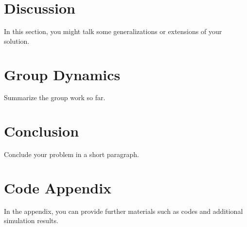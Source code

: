 \documentclass[10pt]{article}
\begin{document}
\section{Discussion}
In this section, you might talk some generalizations or extensions of your solution.

\section{Group Dynamics}
Summarize the group work so far.

\section{Conclusion}
Conclude your problem in a short paragraph.





\appendix
\section{Code Appendix}
In the appendix, you can provide further materials such as codes and additional simulation results.
\end{document}
